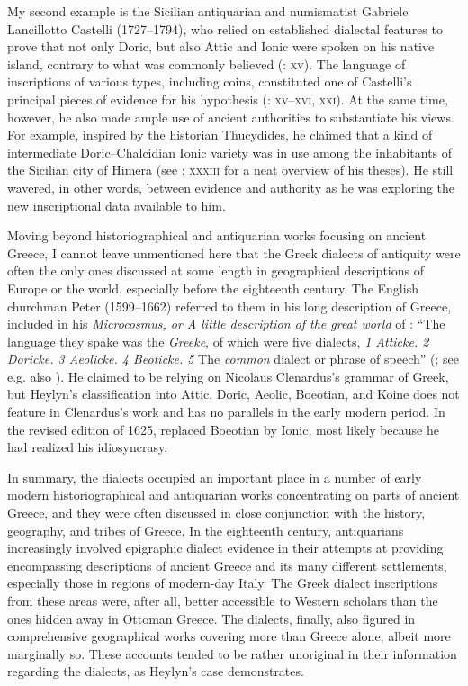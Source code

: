 My second example is the Sicilian antiquarian and numismatist Gabriele Lancillotto Castelli (1727–1794), who relied on established dialectal features to prove that not only Doric, but also Attic and Ionic were spoken on his native island, contrary to what was commonly believed (\citeyear{Castelli1769}: \textsc{xv}). The language of inscriptions of various types, including coins, constituted one of Castelli’s principal pieces of evidence for his hypothesis (\citealt{Castelli1769}: \textsc{xv–xvi,} \textsc{xxi}). At the same time, however, he also made ample use of ancient authorities to substantiate his views. For example, inspired by the historian Thucydides, he claimed that a kind of intermediate Doric–Chalcidian Ionic variety was in use among the inhabitants of the Sicilian city of Himera (see \citealt{Castelli1769}: \textsc{xxxiii} for a neat overview of his theses). He still wavered, in other words, between evidence and authority as he was exploring the new inscriptional data available to him.

Moving beyond historiographical and antiquarian works focusing on ancient Greece, I cannot leave unmentioned here that the Greek dialects of antiquity were often the only ones discussed at some length in geographical descriptions of Europe or the world, especially before the eighteenth century. The English churchman Peter  (1599–1662) referred to them in his long description of Greece, included in his \textit{Microcosmus, or A little description of the great world} of \citeyear{Heylyn1621}: “The language they spake was the \textit{Greeke}, of which were five dialects, \textit{1 Atticke. 2 Doricke. 3 Aeolicke. 4 Beoticke. 5} The \textit{common} dialect or phrase of speech” (\citealt[205]{Heylyn1621}; see e.g. also \citealt[15, 60, 63]{Speed1676}). He claimed to be relying on Nicolaus Clenardus’s grammar of Greek, but Heylyn’s classification into Attic, Doric, Aeolic, Boeotian, and Koine does not feature in Clenardus’s work and has no parallels in the early modern period. In the revised edition of 1625, \citet[375]{Heylyn1625} replaced Boeotian by Ionic, most likely because he had realized his idiosyncrasy.

In summary, the dialects occupied an important place in a number of early modern historiographical and antiquarian works concentrating on parts of ancient Greece, and they were often discussed in close conjunction with the history, geography, and tribes of Greece. In the eighteenth century, antiquarians increasingly involved epigraphic dialect evidence in their attempts at providing encompassing descriptions of ancient Greece and its many different settlements, especially those in regions of modern-day Italy. The Greek dialect inscriptions from these areas were, after all, better accessible to Western scholars than the ones hidden away in Ottoman Greece. The dialects, finally, also figured in comprehensive geographical works covering more than Greece alone, albeit more marginally so. These accounts tended to be rather unoriginal in their information regarding the dialects, as Heylyn’s case demonstrates.

